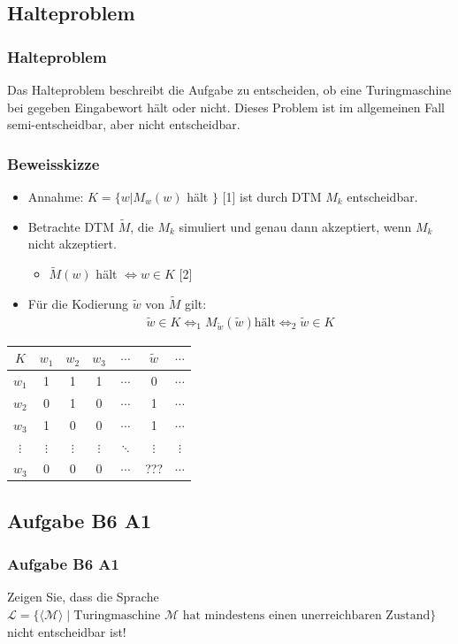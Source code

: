 \subsection{Halteproblem}
\begin{frame}
	\frametitle{Halteproblem}
	Das Halteproblem beschreibt die Aufgabe zu entscheiden, ob eine Turingmaschine bei gegeben Eingabewort hält oder nicht. Dieses Problem ist im allgemeinen Fall semi-entscheidbar, aber nicht entscheidbar.
\end{frame}
\begin{frame}
	\frametitle{Beweisskizze}
	\begin{itemize}
		\item Annahme: $K = \{ w \vert M_w(w)$ hält $\}$ [1] ist durch DTM $M_k$ entscheidbar.
		\item Betrachte DTM $\tilde M$, die $M_k$ simuliert und genau dann akzeptiert, wenn $M_k$ nicht akzeptiert.
		\begin{itemize}
			\item $\tilde M(w)$ hält $\Leftrightarrow w \in K$ [2]
		\end{itemize}
		\item Für die Kodierung $\tilde w$ von $\tilde M$ gilt:
		\begin{align*}
			\tilde w \in K \Leftrightarrow_1 M_{\tilde w}(\tilde w) \text{hält} \Leftrightarrow_2 \tilde w \in K
		\end{align*}
	\end{itemize}
	\begin{tabular}{|c|c|c|c|c|c|c|}
	\hline
	$K$ & $w_1$ & $w_2$ & $w_3$ & $\cdots$ & $\tilde w$ & $\cdots$\\
	\hline
	$w_1$ & \color{red} 1 & 1 & 1 & $\cdots$ & 0 & $\cdots$\\
	\hline
	$w_2$ & 0 & \color{red} 1 & 0 & $\cdots$ & 1 & $\cdots$\\
	\hline
	$w_3$ & 1 & 0 & \color{red} 0 & $\cdots$ & 1 & $\cdots$\\
	\hline
	$\vdots$ & $\vdots$ & $\vdots$ & $\vdots$ & \color{red} $\ddots$ & $\vdots$ & $\vdots$\\
	\hline
	$w_3$ & 0 & 0 & 0 & $\cdots$ & \color{red} ??? & $\cdots$\\
	\hline
	\end{tabular}
\end{frame}
\subsection{Aufgabe B6 A1}
\begin{frame}
	\frametitle{Aufgabe B6 A1}
	Zeigen Sie, dass die Sprache \\ $\mathcal{L} = \{\langle\mathcal{M}\rangle \; | \; \mbox{Turingmaschine $\mathcal{M}$ hat mindestens einen unerreichbaren Zustand}\}$ \\ nicht entscheidbar ist!
\end{frame}

